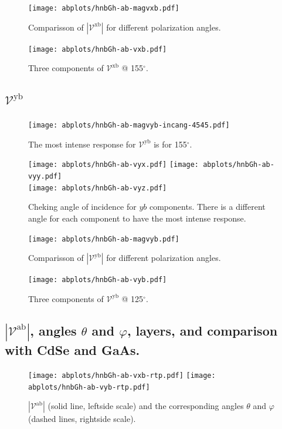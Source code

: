 \documentclass{article}
\let\Oldsubsection\subsection
\renewcommand{\subsection}{\FloatBarrier\Oldsubsection}
\begin{document}
\begin{figure}[ht!]
    \centering
    \texttt{[image: abplots/hnbGh-ab-magvxb.pdf]}
    \caption{Comparisson of $|\mathcal{V}^{\mathrm{xb}}|$ for different
    polarization angles.}
    \label{fig:ab-magvxb}
\end{figure}
\begin{figure}[ht!]
    \centering
    \texttt{[image: abplots/hnbGh-ab-vxb.pdf]}
    \caption{Three components of $\mathcal{V}^{\mathrm{xb}} $ @ 155$^{\circ}$.}
    \label{fig:ab-vxb}
\end{figure}

\clearpage

\subsection{$\mathcal{V}^{\mathrm{yb}} $}
\begin{figure}[h!]
    \centering
    \texttt{[image: abplots/hnbGh-ab-magvyb-incang-4545.pdf]}
    \caption{The most intense response for $\mathcal{V}^{\mathrm{yb}} $ is for 
    155$^{\circ}$.}
    \label{fig:ab-magvybincang}
\end{figure}
\begin{figure}[h!]
    \centering
    \texttt{[image: abplots/hnbGh-ab-vyx.pdf]}
    \texttt{[image: abplots/hnbGh-ab-vyy.pdf]}\\
    \texttt{[image: abplots/hnbGh-ab-vyz.pdf]}
    \caption{Cheking angle of incidence for $yb$ components. There is a
    different angle for each component to have the most intense response.}
    \label{fig:ab-ybangcomp}
\end{figure}

\begin{figure}[ht!]
    \centering
    \texttt{[image: abplots/hnbGh-ab-magvyb.pdf]}
    \caption{Comparisson of $|\mathcal{V}^{\mathrm{yb}}|$ for different
    polarization angles.}
    \label{fig:ab-magvyb}
\end{figure}
\begin{figure}[ht!]
    \centering
    \texttt{[image: abplots/hnbGh-ab-vyb.pdf]}
    \caption{Three components of $\mathcal{V}^{\mathrm{yb}} $ @ 125$^{\circ}$.}
    \label{fig:ab-vyb}
\end{figure}

\clearpage

\subsection{$|\mathcal{V}^{\mathrm{ab}}|$, angles
$\theta$ and $\varphi$, layers, and comparison with CdSe and GaAs.}
\begin{figure}[ht]
    \centering
    \texttt{[image: abplots/hnbGh-ab-vxb-rtp.pdf]}
    \texttt{[image: abplots/hnbGh-ab-vyb-rtp.pdf]}
    \caption{$|\mathcal{V}^{\mathrm{ab}}|$ (solid line, leftside scale) and the
    corresponding angles $\theta$ and $\varphi$ (dashed lines, rightside scale).}
    \label{fig:ab-rtp}
\end{figure}
 
\end{document}
